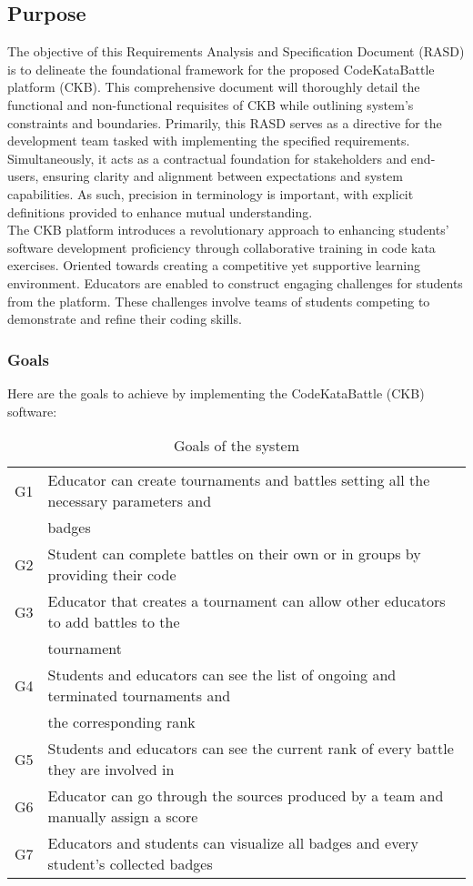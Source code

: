 \subsection{Purpose}
The objective of this Requirements Analysis and Specification Document (RASD) is to delineate the foundational framework for the proposed CodeKataBattle platform (CKB). This comprehensive document will thoroughly detail the functional and non-functional requisites of CKB while outlining system's constraints and boundaries. Primarily, this RASD serves as a directive for the development team tasked with implementing the specified requirements. Simultaneously, it acts as a contractual foundation for stakeholders and end-users, ensuring clarity and alignment between expectations and system capabilities. As such, precision in terminology is important, with explicit definitions provided to enhance mutual understanding. \\
The CKB platform introduces a revolutionary approach to enhancing students' software development proficiency through collaborative training in code kata exercises. Oriented towards creating a competitive yet supportive learning environment. Educators are enabled to construct engaging challenges for students from the platform. These challenges involve teams of students competing to demonstrate and refine their coding skills.

\subsubsection{Goals}
Here are the goals to achieve by implementing the CodeKataBattle (CKB) software:
\begin{table}[h]
    \centering
    \begin{tabular}{|l|l|}
        \hline
        G1 & Educator can create tournaments and battles setting all the necessary parameters and\\& badges \\
        \hline
        G2 & Student can complete battles on their own or in groups by providing their code \\
        \hline
        G3 & Educator that creates a tournament can allow other educators to add battles to the\\&tournament\\
        \hline
        G4 & Students and educators can see the list of ongoing and terminated tournaments and\\&the corresponding rank \\
        \hline
        G5 & Students and educators can see the current rank of every battle they are involved in \\
        \hline
        G6 & Educator can go through the sources produced by a team and manually assign a score \\
        \hline
        G7 & Educators and students can visualize all badges and every student’s collected badges \\
        \hline
    \end{tabular}
    \caption{Goals of the system}
    \label{tab:goals}
\end{table}

